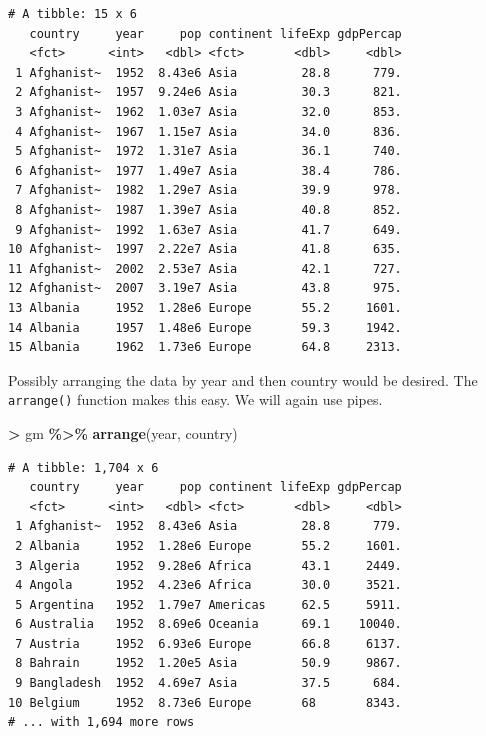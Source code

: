 \documentclass[
]{krantz}
\makeatletter
\newenvironment{Shaded}{\begin{snugshade}}{\end{snugshade}}
\newcommand{\KeywordTok}[1]{\textcolor[rgb]{0.27,0.27,0.27}{\textbf{#1}}}
\newcommand{\NormalTok}[1]{#1}
\newcommand{\OperatorTok}[1]{\textcolor[rgb]{0.43,0.43,0.43}{\textbf{#1}}}
\newcommand{\StringTok}[1]{\textcolor[rgb]{0.5,0.5,0.5}{#1}}
\newenvironment{kframe}{%
\medskip{}
\setlength{\fboxsep}{.8em}
 \def\at@end@of@kframe{}%
 \ifinner\ifhmode%
  \def\at@end@of@kframe{\end{minipage}}%
  \begin{minipage}{\columnwidth}%
 \fi\fi%
 \def\FrameCommand##1{\hskip\@totalleftmargin \hskip-\fboxsep
 \colorbox{shadecolor}{##1}\hskip-\fboxsep
     \hskip-\linewidth \hskip-\@totalleftmargin \hskip\columnwidth}%
 \MakeFramed {\advance\hsize-\width
   \@totalleftmargin\z@ \linewidth\hsize
   \@setminipage}}%
 {\par\unskip\endMakeFramed%
 \at@end@of@kframe}
\renewenvironment{Shaded}{\begin{kframe}}{\end{kframe}}
\makeatother
\begin{document}
\begin{verbatim}
# A tibble: 15 x 6
   country     year     pop continent lifeExp gdpPercap
   <fct>      <int>   <dbl> <fct>       <dbl>     <dbl>
 1 Afghanist~  1952  8.43e6 Asia         28.8      779.
 2 Afghanist~  1957  9.24e6 Asia         30.3      821.
 3 Afghanist~  1962  1.03e7 Asia         32.0      853.
 4 Afghanist~  1967  1.15e7 Asia         34.0      836.
 5 Afghanist~  1972  1.31e7 Asia         36.1      740.
 6 Afghanist~  1977  1.49e7 Asia         38.4      786.
 7 Afghanist~  1982  1.29e7 Asia         39.9      978.
 8 Afghanist~  1987  1.39e7 Asia         40.8      852.
 9 Afghanist~  1992  1.63e7 Asia         41.7      649.
10 Afghanist~  1997  2.22e7 Asia         41.8      635.
11 Afghanist~  2002  2.53e7 Asia         42.1      727.
12 Afghanist~  2007  3.19e7 Asia         43.8      975.
13 Albania     1952  1.28e6 Europe       55.2     1601.
14 Albania     1957  1.48e6 Europe       59.3     1942.
15 Albania     1962  1.73e6 Europe       64.8     2313.
\end{verbatim}

Possibly arranging the data by year and then country would be desired. The \texttt{arrange()} function makes this easy. We will again use pipes.

\begin{Shaded}
\begin{Highlighting}[]
\OperatorTok{\textgreater{}}\StringTok{ }\NormalTok{gm }\OperatorTok{\%\textgreater{}\%}\StringTok{ }\KeywordTok{arrange}\NormalTok{(year, country)}
\end{Highlighting}
\end{Shaded}

\begin{verbatim}
# A tibble: 1,704 x 6
   country     year     pop continent lifeExp gdpPercap
   <fct>      <int>   <dbl> <fct>       <dbl>     <dbl>
 1 Afghanist~  1952  8.43e6 Asia         28.8      779.
 2 Albania     1952  1.28e6 Europe       55.2     1601.
 3 Algeria     1952  9.28e6 Africa       43.1     2449.
 4 Angola      1952  4.23e6 Africa       30.0     3521.
 5 Argentina   1952  1.79e7 Americas     62.5     5911.
 6 Australia   1952  8.69e6 Oceania      69.1    10040.
 7 Austria     1952  6.93e6 Europe       66.8     6137.
 8 Bahrain     1952  1.20e5 Asia         50.9     9867.
 9 Bangladesh  1952  4.69e7 Asia         37.5      684.
10 Belgium     1952  8.73e6 Europe       68       8343.
# ... with 1,694 more rows
\end{verbatim}
\end{document}

